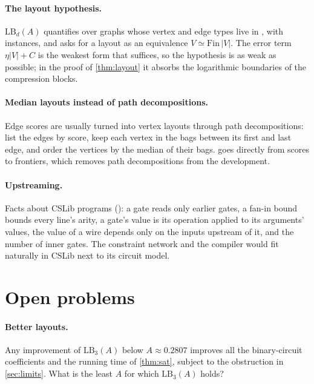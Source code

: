 \documentclass[11pt]{article}
\theoremstyle{plain}
\theoremstyle{definition}
\theoremstyle{remark}
\newcommand{\LB}{\mathrm{LB}}
\newcommand{\card}[1]{\lvert #1\rvert}
\begin{document}
\paragraph{The layout hypothesis.}
$\LB_d(A)$ quantifies over graphs whose vertex and edge types live in , with
 instances, and asks for a layout as an equivalence $V \simeq \mathrm{Fin}\,\card V$.
The error term $\eta\card V + C$ is the weakest form that suffices, so the hypothesis is as weak
as possible; in the proof of \cref{thm:layout} it absorbs the logarithmic boundaries of the
compression blocks.

\paragraph{Median layouts instead of path decompositions.}
Edge scores are usually turned into vertex layouts through path decompositions: list the edges
by score, keep each vertex in the bags between its first and last edge, and order the vertices
by the median of their bags.  goes directly from scores to frontiers, which
removes path decompositions from the development.

\paragraph{Upstreaming.}
Facts about CSLib programs (): a gate reads only earlier
gates, a fan-in bound bounds every line's arity, a gate's value is its operation applied to its
arguments' values, the value of a wire depends only on the inputs upstream of it, and the
number of inner gates. The constraint network and the compiler would fit naturally in CSLib
next to its circuit model.

\section{Open problems}
\label{sec:open}

\paragraph{Better layouts.}
Any improvement of $\LB_3(A)$ below $A \approx 0.2807$ improves all the binary-circuit
coefficients and the running time of \cref{thm:sat}, subject to the obstruction in
\cref{sec:limits}. What is the least $A$ for which $\LB_3(A)$ holds?
\end{document}

